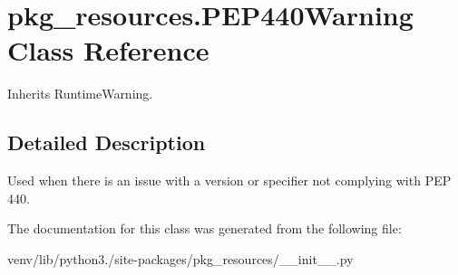 \hypertarget{classpkg__resources_1_1_p_e_p440_warning}{}\section{pkg\+\_\+resources.\+P\+E\+P440\+Warning Class Reference}
\label{classpkg__resources_1_1_p_e_p440_warning}


Inherits Runtime\+Warning.



\subsection{Detailed Description}
\begin{DoxyVerb}Used when there is an issue with a version or specifier not complying with
PEP 440.
\end{DoxyVerb}
 

The documentation for this class was generated from the following file\+:\begin{DoxyCompactItemize}
\item 
venv/lib/python3./site-\/packages/pkg\+\_\+resources/\+\_\+\+\_\+init\+\_\+\+\_\+.\+py\end{DoxyCompactItemize}
